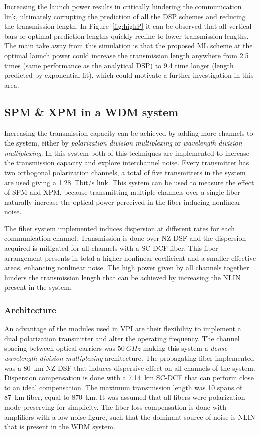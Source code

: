 Increasing the launch power results in critically hindering the communication link, ultimately corrupting the prediction of all the DSP schemes and reducing the transmission length. In Figure~\ref{fig:highP} it can be observed that all vertical bars or optimal prediction lengths quickly recline to lower transmission lengths. The main take away from this simulation is that the proposed ML scheme at the optimal launch power could increase the transmission length anywhere from 2.5 times (same performance as the analytical DSP) to 9.4 time longer (length predicted by exponential fit), which could motivate a further investigation in this area.




\subsection{SPM \& XPM in a WDM system}

Increasing the transmission capacity can be achieved by adding more channels to the system, either by \textit{polarization division multiplexing} or \textit{wavelength division multiplexing}. In this system both of this techniques are implemented to increase the transmission capacity and explore interchannel noise. Every transmitter has two orthogonal polarization channels, a total of five transmitters in the system are used giving a 1.28~Tbit/s link. This system can be used to measure the effect of SPM and XPM, because transmitting multiple channels over a single fiber naturally increase the optical power perceived in the fiber inducing nonlinear noise. 

The fiber system implemented  induces dispersion at different rates for each communication channel. Transmission is done over NZ-DSF and the dispersion acquired is mitigated for all channels with a SC-DCF fiber. This fiber arrangement presents in total a higher nonlinear coefficient and a smaller effective areas, enhancing nonlinear noise. The high power given by all channels together hinders the transmission length that can be achieved by increasing the NLIN present in the system.

\subsubsection{Architecture}

An advantage of the modules used in VPI are their flexibility to implement a dual polarization transmitter and  alter the operating frequency. The channel spacing between optical carriers was $50~GHz$ making this system a \textit{dense wavelength division multiplexing} architecture. The propagating fiber implemented was a 80~km NZ-DSF that induces dispersive effect on all channels of the system. Dispersion compensation is done with a 7.14~km SC-DCF that can perform close to an ideal compensation. The maximum transmission length was 10 spans of 87~km fiber, equal to 870~km. It was assumed that all fibers were polarization mode preserving for simplicity. The fiber loss compensation is done with amplifiers with a low noise figure, such that the dominant source of noise is NLIN that is present in the WDM system.  

